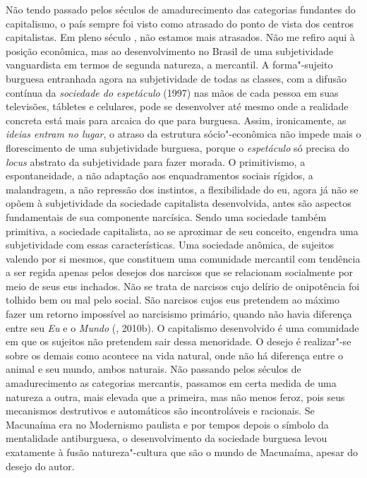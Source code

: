Não tendo passado pelos séculos de amadurecimento das categorias
fundantes do capitalismo, o país sempre foi visto como atrasado do ponto
de vista dos centros capitalistas. Em pleno século , não estamos mais
atrasados. Não me refiro aqui à posição econômica, mas ao
desenvolvimento no Brasil de uma subjetividade vanguardista em termos de
segunda natureza, a mercantil. A forma"-sujeito burguesa entranhada agora
na subjetividade de todas as classes, com a difusão contínua da
\emph{sociedade do espetáculo} (1997) nas mãos de cada pessoa em
suas televisões, tábletes e celulares, pode se desenvolver até mesmo
onde a realidade concreta está mais para arcaica do que para burguesa.
Assim, ironicamente, as \emph{ideias entram no lugar}, o atraso da
estrutura sócio"-econômica não impede mais o florescimento de uma
subjetividade burguesa, porque o \emph{espetáculo} só precisa do
\emph{locus} abstrato da subjetividade para fazer morada. O
primitivismo, a espontaneidade, a não adaptação aos enquadramentos
sociais rígidos, a malandragem, a não repressão dos instintos, a
flexibilidade do eu, agora já não se opõem à subjetividade da sociedade
capitalista desenvolvida, antes são aspectos fundamentais de sua
componente narcísica. Sendo uma sociedade também primitiva, a sociedade
capitalista, ao se aproximar de seu conceito, engendra uma subjetividade
com essas características. Uma sociedade anômica, de sujeitos valendo
por si mesmos, que constituem uma comunidade mercantil com tendência a
ser regida apenas pelos desejos dos narcisos que se relacionam
socialmente por meio de seus eus inchados. Não se trata de narcisos cujo
delírio de onipotência foi tolhido bem ou mal pelo social. São narcisos
cujos eus pretendem ao máximo fazer um retorno impossível ao narcisismo
primário, quando não havia diferença entre seu \emph{Eu} e o
\emph{Mundo} (, 2010b). O capitalismo desenvolvido é uma
comunidade em que os sujeitos não pretendem sair dessa menoridade. O
desejo é realizar"-se sobre os demais como acontece na vida natural, onde
não há diferença entre o animal e seu mundo, ambos naturais. Não
passando pelos séculos de amadurecimento as categorias mercantis,
passamos em certa medida de uma natureza a outra, mais elevada que a
primeira, mas não menos feroz, pois seus mecanismos destrutivos e
automáticos são incontroláveis e racionais. Se Macunaíma era no
Modernismo paulista e por tempos depois o símbolo da mentalidade
antiburguesa, o desenvolvimento da sociedade burguesa levou exatamente à
fusão natureza"-cultura que são o mundo de Macunaíma, apesar do desejo do
autor.

